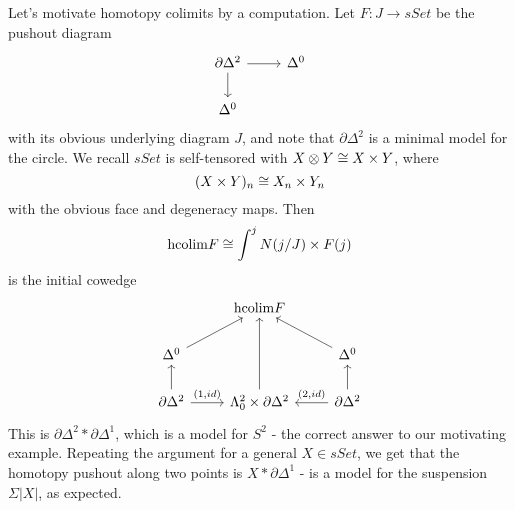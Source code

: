 \begin{example}
Let's motivate homotopy colimits by a computation. Let \newline$F:J\rightarrow sSet$ be the pushout diagram
\[\begin{tikzcd}
\partial \Delta^2 \arrow[r] \arrow[d] & \Delta^0 \\
\Delta^0                              &         
\end{tikzcd}\] with its obvious underlying diagram $J$, and note that $\partial \Delta^2$ is a minimal model for the circle. We recall $sSet$ is self-tensored with $X\otimes Y\cong X\times Y$, where $$(X\times Y)_n\cong X_n\times Y_n$$ with the obvious face and degeneracy maps. 
Then $$\text{hcolim}F\cong \int^jN(j/J)\times F(j)$$ is the initial cowedge
\[
\begin{tikzcd}
                                                  & \text{hcolim}F                                 &                                                    \\
\Delta^0 \arrow[ru]                               &                                                & \Delta^0 \arrow[lu]                                \\
\partial \Delta^2 \arrow[u] \arrow[r, "{(1,id)}"] & \Lambda^2_0\times \partial \Delta^2 \arrow[uu] & \partial \Delta^2 \arrow[l, "{(2,id)}"'] \arrow[u]
\end{tikzcd}\]
This is $\partial \Delta^2*\partial \Delta^1$, which is a model for $S^2$ - the correct answer to our motivating example. Repeating the argument for a general $X\in sSet$, we get that the homotopy pushout along two points is $X*\partial \Delta^1$ - is a model for the suspension $\Sigma|X|$, as expected.



\end{example}
